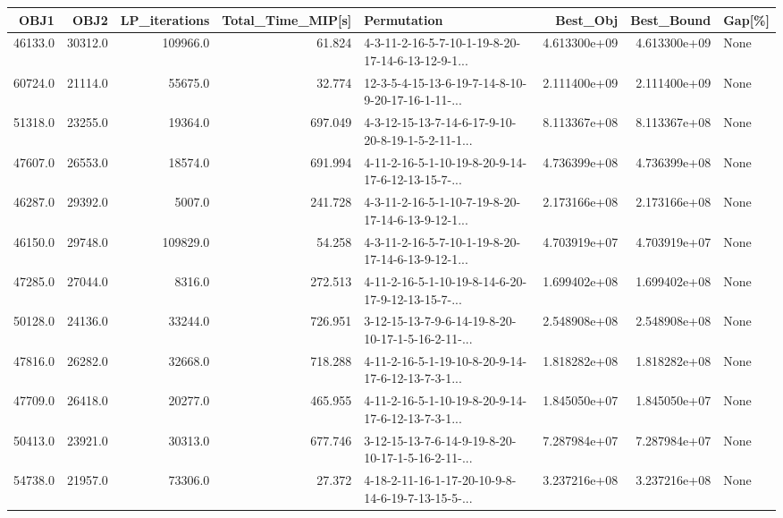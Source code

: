 \begin{tabular}{rrrrlrrl}
\toprule
    OBJ1 &     OBJ2 &  LP\_iterations &  Total\_Time\_MIP[s] &                                        Permutation &      Best\_Obj &    Best\_Bound & Gap[\%] \\
\midrule
 46133.0 &  30312.0 &       109966.0 &             61.824 &  4-3-11-2-16-5-7-10-1-19-8-20-17-14-6-13-12-9-1... &  4.613300e+09 &  4.613300e+09 &   None \\
 60724.0 &  21114.0 &        55675.0 &             32.774 &  12-3-5-4-15-13-6-19-7-14-8-10-9-20-17-16-1-11-... &  2.111400e+09 &  2.111400e+09 &   None \\
 51318.0 &  23255.0 &        19364.0 &            697.049 &  4-3-12-15-13-7-14-6-17-9-10-20-8-19-1-5-2-11-1... &  8.113367e+08 &  8.113367e+08 &   None \\
 47607.0 &  26553.0 &        18574.0 &            691.994 &  4-11-2-16-5-1-10-19-8-20-9-14-17-6-12-13-15-7-... &  4.736399e+08 &  4.736399e+08 &   None \\
 46287.0 &  29392.0 &         5007.0 &            241.728 &  4-3-11-2-16-5-1-10-7-19-8-20-17-14-6-13-9-12-1... &  2.173166e+08 &  2.173166e+08 &   None \\
 46150.0 &  29748.0 &       109829.0 &             54.258 &  4-3-11-2-16-5-7-10-1-19-8-20-17-14-6-13-9-12-1... &  4.703919e+07 &  4.703919e+07 &   None \\
 47285.0 &  27044.0 &         8316.0 &            272.513 &  4-11-2-16-5-1-10-19-8-14-6-20-17-9-12-13-15-7-... &  1.699402e+08 &  1.699402e+08 &   None \\
 50128.0 &  24136.0 &        33244.0 &            726.951 &  3-12-15-13-7-9-6-14-19-8-20-10-17-1-5-16-2-11-... &  2.548908e+08 &  2.548908e+08 &   None \\
 47816.0 &  26282.0 &        32668.0 &            718.288 &  4-11-2-16-5-1-19-10-8-20-9-14-17-6-12-13-7-3-1... &  1.818282e+08 &  1.818282e+08 &   None \\
 47709.0 &  26418.0 &        20277.0 &            465.955 &  4-11-2-16-5-1-10-19-8-20-9-14-17-6-12-13-7-3-1... &  1.845050e+07 &  1.845050e+07 &   None \\
 50413.0 &  23921.0 &        30313.0 &            677.746 &  3-12-15-13-7-6-14-9-19-8-20-10-17-1-5-16-2-11-... &  7.287984e+07 &  7.287984e+07 &   None \\
 54738.0 &  21957.0 &        73306.0 &             27.372 &  4-18-2-11-16-1-17-20-10-9-8-14-6-19-7-13-15-5-... &  3.237216e+08 &  3.237216e+08 &   None \\

\end{tabular}
